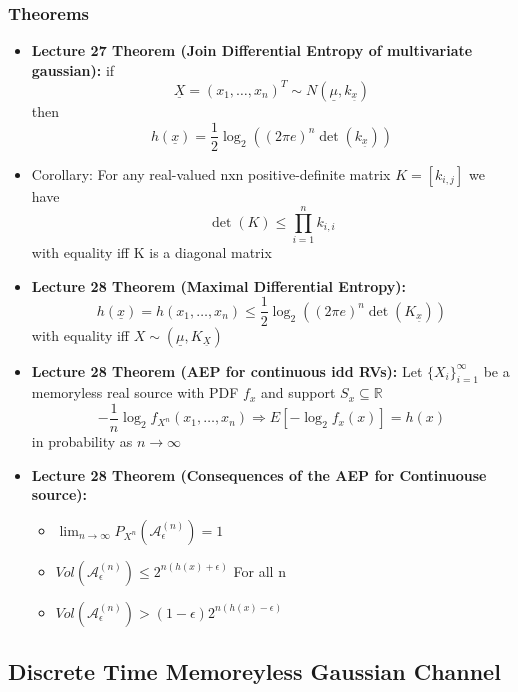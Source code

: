 \documentclass{article}
\begin{document}
\subsubsection{Theorems}
\begin{itemize}
    \item \textbf{Lecture 27 Theorem (Join Differential Entropy of multivariate gaussian):}
    if
    \[\underline{X} = (x_1, \ldots, x_n)^T \sim N(\underline{\mu}, k_{\underline{x}})\]
    then
    \[h(\underline{x}) = \frac{1}{2} \log_2 ((2\pi e)^n \det(k_{\underline{x}}))\]
    \item  Corollary:
    For any real-valued nxn positive-definite matrix \(K=[k_{i,j}]\)
    we have 
    \[\det(K) \leq \prod_{i=1}^{n} k_{i,i}\]
    with equality iff K is a diagonal matrix

    \item \textbf{Lecture 28 Theorem (Maximal Differential Entropy):}
    \[h(\underline{x}) = h(x_1, \ldots, x_n) \leq \frac{1}{2} \log_2((2\pi e)^n \det(K_{\underline{x}}))\]
    with equality iff \(X \sim (\underline{\mu}, K_{\underline{X}})\)
    \item \textbf{Lecture 28 Theorem (AEP for continuous idd RVs):}
    Let \(\{X_i\}_{i=1}^\infty\) be a memoryless real source with PDF \(f_x\) and support \(S_x \subseteq \mathbb{R}\)
    \[-\frac{1}{n} \log_2 f_{X^n}(x_1, \ldots, x_n) \Longrightarrow E[-\log_2 f_x(x)] = h(x)\]
    in probability as \(n \to \infty\)
    \item \textbf{Lecture 28 Theorem (Consequences of the AEP for Continuouse source):}
    \begin{itemize}
        \item \(\lim_{n\to\infty} P_{X^n}(\mathcal{A}_{\epsilon}^{(n)})=1\)
        \item \(Vol(\mathcal{A}_{\epsilon}^{(n)}) \leq 2^{n(h(x)+\epsilon)}\) For all n
        \item \(Vol(\mathcal{A}_{\epsilon}^{(n)}) > (1-\epsilon) 2^{n(h(x)-\epsilon)}\)
    \end{itemize}
\end{itemize}
\subsection{Discrete Time Memoreyless Gaussian Channel}
\end{document}
